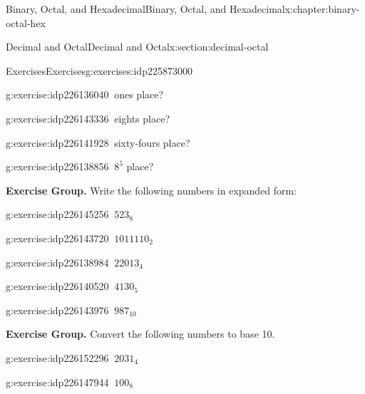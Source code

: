 \documentclass[twoside,10pt,]{book}
\numberwithin{equation}{section}
\begin{document}
\begin{chapterptx}{Binary, Octal, and Hexadecimal}{}{Binary, Octal, and Hexadecimal}{}{}{x:chapter:binary-octal-hex}
\begin{sectionptx}{Decimal and Octal}{}{Decimal and Octal}{}{}{x:section:decimal-octal}
\begin{exercises-subsection}{Exercises}{}{Exercises}{}{}{g:exercises:idp225873000}
\begin{exercisegroup}
\begin{divisionexerciseeg}{8}{}{}{g:exercise:idp226136040}%
\(\ \)ones place?\end{divisionexerciseeg}%
\begin{divisionexerciseeg}{9}{}{}{g:exercise:idp226143336}%
\(\ \)eights place?\end{divisionexerciseeg}%
\begin{divisionexerciseeg}{10}{}{}{g:exercise:idp226141928}%
\(\ \)sixty-fours place?\end{divisionexerciseeg}%
\begin{divisionexerciseeg}{11}{}{}{g:exercise:idp226138856}%
\(\ 8^5\) place?\end{divisionexerciseeg}%
\end{exercisegroup}
\par\medskip\noindent
\par\medskip\noindent%
\textbf{Exercise Group.}\space\space%
Write the following numbers in expanded form:%
\begin{exercisegroup}
\begin{divisionexerciseeg}{12}{}{}{g:exercise:idp226145256}%
\(\ 523_8\)\end{divisionexerciseeg}%
\begin{divisionexerciseeg}{13}{}{}{g:exercise:idp226143720}%
\(\ 1011110_2\)\end{divisionexerciseeg}%
\begin{divisionexerciseeg}{14}{}{}{g:exercise:idp226138984}%
\(\ 22013_4\)\end{divisionexerciseeg}%
\begin{divisionexerciseeg}{15}{}{}{g:exercise:idp226140520}%
\(\ 4130_5\)\end{divisionexerciseeg}%
\begin{divisionexerciseeg}{16}{}{}{g:exercise:idp226143976}%
\(\ 987_{10}\)\end{divisionexerciseeg}%
\end{exercisegroup}
\par\medskip\noindent
\par\medskip\noindent%
\textbf{Exercise Group.}\space\space%
Convert the following numbers to base 10.%
\begin{exercisegroup}
\begin{divisionexerciseeg}{17}{}{}{g:exercise:idp226152296}%
\(\ 2031_4\)\end{divisionexerciseeg}%
\begin{divisionexerciseeg}{19}{}{}{g:exercise:idp226147944}%
\(\ 100_8\)\end{divisionexerciseeg}%

\end{exercisegroup}
\end{exercises-subsection}
\end{sectionptx}
\end{chapterptx}
\end{document}
